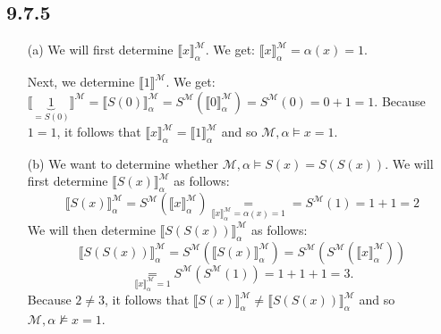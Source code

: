 \subsection*{9.7.5}
\begin{enumerate}

  \item[(a)] We will first determine
    $\llbracket x \rrbracket ^\mathcal{M}_\alpha$.
    We get:
    $\llbracket x \rrbracket ^\mathcal{M}_\alpha =\alpha(x)= 1$.

    Next, we determine $\llbracket 1 \rrbracket ^\mathcal{M}$.
    We get:
    $\llbracket \underbrace{1}_{=S(0)} \rrbracket ^\mathcal{M} = \llbracket S(0)\rrbracket ^\mathcal{M}_\alpha = S^\mathcal{M}(\llbracket 0 \rrbracket ^\mathcal{M}_\alpha) = S^\mathcal{M}(0) = 0 + 1 = 1$.
    Because $1 = 1$, it follows that $\llbracket x\rrbracket_{\alpha}^{\mathcal{M}}=\llbracket 1\rrbracket_{\alpha}^{\mathcal{M}}$ and so $\mathcal{M},\alpha\vDash x=1$.

\item[(b)]  We want to determine whether
    $\mathcal{M},\alpha\vDash S(x)=S(S(x))$.
    We will first determine
    $\llbracket S(x) \rrbracket ^\mathcal{M}_\alpha $ as follows:
    \[\llbracket S(x) \rrbracket ^\mathcal{M}_\alpha =%
    S^\mathcal{M}(\llbracket x \rrbracket ^\mathcal{M}_\alpha)%
    \underset{\llbracket x\rrbracket_{\alpha}^{\mathcal{M}}=\alpha(x)=1}{=}=%
    S^\mathcal{M}(1) = 1 + 1 = 2\]
    We will then determine $\llbracket S(S(x)) \rrbracket ^\mathcal{M}_\alpha$ as follows:
    \[\llbracket S(S(x)) \rrbracket ^\mathcal{M}_\alpha %
    = S^\mathcal{M}(\llbracket S(x) \rrbracket ^\mathcal{M}_\alpha) %
    = S^\mathcal{M}(S^\mathcal{M}(\llbracket x \rrbracket ^\mathcal{M}_\alpha))\] %
    \[\underset{\llbracket x\rrbracket_{\alpha}^{\mathcal{M}}=1}{=}%
    S^\mathcal{M}(S^\mathcal{M}(1)) = 1 + 1 + 1 = 3.\]
    Because $2 \neq 3$, it follows that
    $\llbracket S(x) \rrbracket ^\mathcal{M}_\alpha \neq \llbracket S(S(x)) \rrbracket ^\mathcal{M}_\alpha$
    and so $\mathcal{M}, \alpha \nvDash x = 1$.


\end{enumerate}
